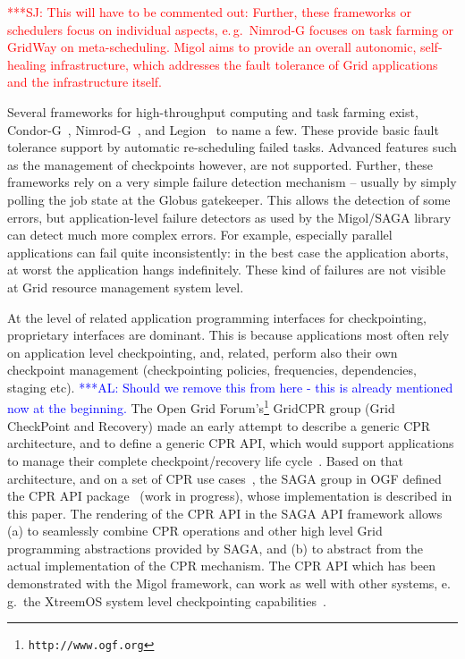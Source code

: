 \documentclass[conference,final]{IEEEtran}
\newcommand{\alnote}[1]{ {\textcolor{blue} { ***AL: #1 }}}
\newcommand{\jhanote}[1]{ {\textcolor{red} { ***SJ: #1 }}}
\newcommand{\alnote}[1]{}
\newcommand{\jhanote}[1]{}
\begin{document}
\jhanote{This will have to be commented out: Further, these frameworks
  or schedulers focus on individual aspects, e.\,g.\ Nimrod-G focuses
  on task farming or GridWay on meta-scheduling. Migol aims to provide
  an overall autonomic, self-healing infrastructure, which addresses
  the fault tolerance of Grid applications and the infrastructure
  itself.}


 Several frameworks for
high-throughput computing and task farming exist,
Condor-G~\cite{citeulike:291860}, Nimrod-G~\cite{buyya00nimrodg}, and
Legion~\cite{689541} to name a few. These provide basic fault
tolerance support by automatic re-scheduling failed tasks. Advanced
features such as the management of checkpoints however, are not
supported. Further, these frameworks rely on a very simple failure
detection mechanism -- usually by simply polling the job state at the
Globus gatekeeper. This allows the detection of some errors, but
application-level failure detectors as used by the Migol/SAGA library
can detect much more complex errors. For example, especially parallel
applications can fail quite inconsistently: in the best case the
application aborts, at worst the application hangs indefinitely. These
kind of failures are not visible at Grid resource management system
level.

At the level of related application programming interfaces for
checkpointing, proprietary interfaces are dominant. This is because
applications most often rely on application level checkpointing, and,
related, perform also their own checkpoint management (checkpointing
policies, frequencies, dependencies, staging etc).  \alnote{Should we
  remove this from here - this is already mentioned now at the
  beginning.}  The Open Grid
Forum's\footnote{\texttt{http://www.ogf.org}} GridCPR group (Grid
CheckPoint and Recovery) made an early attempt to describe a generic
CPR architecture, and to define a generic CPR API, which would support
applications to manage their complete checkpoint/recovery life
cycle~\cite{ogf_cpr_arch}.  Based on that architecture, and on a set
of CPR use cases~\cite{ogf_cpr_uc}, the SAGA group in OGF defined the
CPR API package~\cite{saga_cpr_draft} (work in progress), whose
implementation is described in this paper.  The rendering of the CPR
API in the SAGA API framework allows (a) to seamlessly combine CPR
operations and other high level Grid programming abstractions provided
by SAGA, and (b) to abstract from the actual implementation of the CPR
mechanism.  The CPR API which has been demonstrated with the Migol
framework, can work as well with other systems, e.\,g.\,
the XtreemOS system level checkpointing
capabilities~\cite{xtreemos_cpr}.
\end{document}
